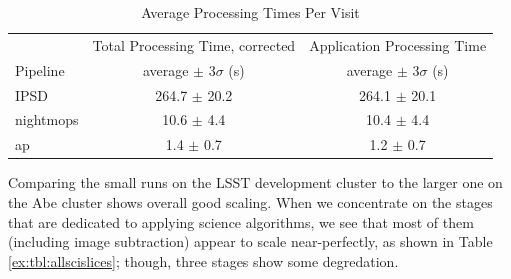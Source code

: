 \begin{table}[ht]
\begin{center}
\caption{Average Processing Times Per Visit
\label{ex:tbl:visitstats}}
\vspace{\baselineskip}
\begin{tabular}{ l | c | c |}
\hline\hline
          & Total Processing Time, corrected
          & Application Processing Time \\ 
Pipeline  & average $\pm$  $3\sigma$ (s) & average $\pm$ $3\sigma$ (s) \\ \hline
IPSD      & 264.7 $\pm$ 20.2 & 264.1 $\pm$ 20.1  \\ 
nightmops & 10.6  $\pm$  4.4 & 10.4 $\pm$  4.4  \\ 
ap        & 1.4   $\pm$  0.7 & 1.2 $\pm$  0.7  \\ \hline
\hline
\end{tabular}

\end{center}
\end{table}

Comparing the small runs on the LSST development cluster to the larger
one on the Abe cluster shows overall good scaling.  When we
concentrate on the stages that are dedicated to applying science
algorithms, we see that most of them (including image subtraction)
appear to scale near-perfectly, as shown in
Table \ref{ex:tbl:allscislices}; though, three stages show some
degredation.  

